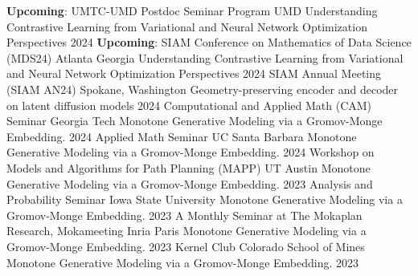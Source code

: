 

\begingroup
\allowdisplaybreaks
\begin{cvtalks}

\cvtalk
    {\textbf{Upcoming}: UMTC-UMD Postdoc Seminar Program} %
    {UMD}
    {Understanding Contrastive Learning from Variational and Neural Network Optimization Perspectives} %
    {2024} %
\cvtalk
    {\textbf{Upcoming}: SIAM Conference on Mathematics of Data Science (MDS24)} %
    {Atlanta Georgia}
    { Understanding Contrastive Learning from Variational and Neural Network Optimization Perspectives} %
    {2024} %
\cvtalk
    {SIAM Annual Meeting (SIAM AN24)} %
    {Spokane, Washington}
    {Geometry-preserving encoder and decoder on latent diffusion models} %
    {2024} %
\cvtalk
    {Computational and Applied Math (CAM) Seminar} %
    {Georgia Tech}
    {Monotone Generative Modeling via a Gromov-Monge Embedding.} %
    {2024} %
\cvtalk
    {Applied Math Seminar} %
    {UC Santa Barbara}
    {Monotone Generative Modeling via a Gromov-Monge Embedding.} %
    {2024} %
\cvtalk
    {Workshop on Models and Algorithms for Path Planning (MAPP)} %
    {UT Austin}
    {Monotone Generative Modeling via a Gromov-Monge Embedding.} %
    {2023} %
\cvtalk
    {Analysis and Probability Seminar}
    {Iowa State University}
    {Monotone Generative Modeling via a Gromov-Monge Embedding.}
    {2023}
\cvtalk
    {A Monthly Seminar at The Mokaplan Research, Mokameeting} %
    {Inria Paris}
    {Monotone Generative Modeling via a Gromov-Monge Embedding.} %
    {2023} %
\cvtalk
    {Kernel Club} %
    {Colorado School of Mines}
    {Monotone Generative Modeling via a Gromov-Monge Embedding.} %
    {2023} %


\end{cvtalks}
